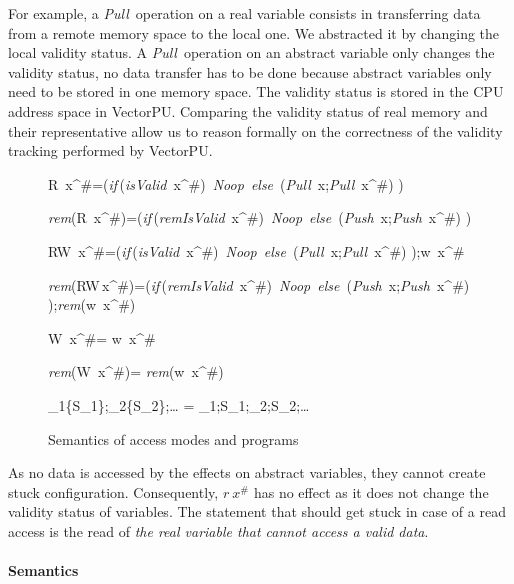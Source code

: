 \documentclass[preprint,12pt]{elsarticle}
\newcommand{\symb}[1]{\textit{#1}}
\newcommand{\noop}{\symb{Noop}}
\newcommand{\Push}{\symb{Push}}
\newcommand{\Pull}{\symb{Pull}}
\newcommand{\isvalid}{\symb{isValid}}
\newcommand{\isremvalid}{\symb{remIsValid}}
\newcommand{\rem}[1]{\symb{rem}(#1)}
\newcommand{\IF}[3]{\symb{if}\,(#1)~#2~\symb{else}~#3 }
\newcommand{\transl}[1]{\llbracket#1\rrbracket}
\newcommand{\abs}[1]{#1^\#}
\newcommand{\AM}{\mathcal{M}}
\begin{document}
For example, a \Pull\ operation on a real variable consists in transferring data from a 
remote memory space 
to the local one. We abstracted it  by changing the local validity status. A \Pull\  
operation on an abstract variable only changes the validity status, no data transfer has 
to be done because abstract variables only need to be stored in one memory space. 
The validity status is stored in the CPU address space in VectorPU. Comparing the validity 
status of real memory and their representative  allow us to reason 
formally on the correctness of the validity tracking performed by VectorPU.

\begin{figure*}[tb]
\begin{mathpar}
\transl{R~\abs x}=(\IF{\isvalid~\abs x}{\noop}{(\Pull~x;\Pull~\abs x)})

\transl{\rem {R~\abs x}}=(\IF{\isremvalid~\abs x}{\noop}{(\Push~x;\Push~\abs x)})

\transl{RW~\abs x}=(\IF{\isvalid~\abs x}{\noop}{(\Pull~x;\Pull~\abs x)});w~\abs x

\transl{\rem{RW\,\abs x}}\!=\!(\IF{\isremvalid~\abs x}{\noop}{({\!\Push~x};\Push~\abs x)});\rem{w~\abs 
x}

\transl{W~\abs x}= w~\abs x

\transl{\rem{W~\abs x}}= \rem{w~\abs x}

\transl{\AM_1\{S_1\};\AM_2\{S_2\};\ldots} = \transl{\AM_1};S_1;\transl{\AM_2};S_2;\ldots
\end{mathpar}
\caption{Semantics of access modes and programs}\label{sem-AM}
\end{figure*}
As no data is accessed by the effects on abstract variables, they cannot create stuck configuration. Consequently, $r~\abs x$ has no effect as it does not 
change the validity 
status of variables. The statement that should get stuck in case of a read access is the 
read of \emph{the real variable that cannot access a valid data}. 


\paragraph{Semantics}
\end{document}
